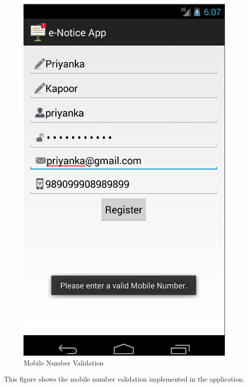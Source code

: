 \begin{figure}[H]
\centering \includegraphics[scale=0.7]{image/mob.png}
\caption{Mobile Number Validation}
\end{figure}
This figure shows the mobile number validation implemented in the application.

